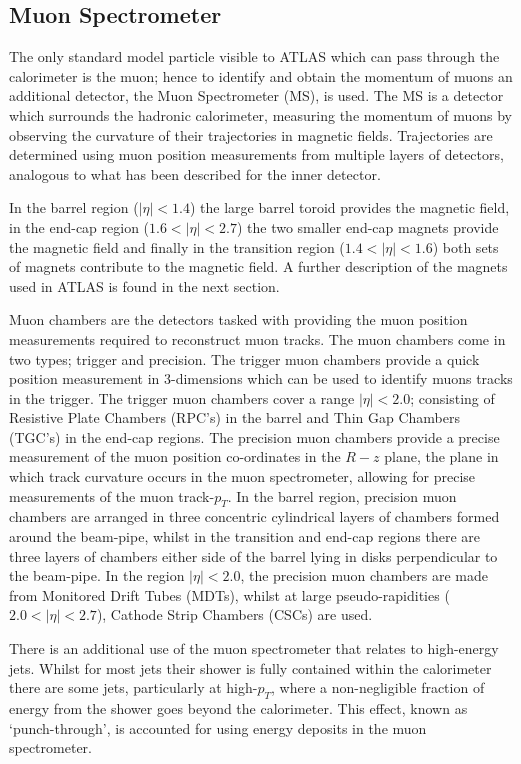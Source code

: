 \subsection{Muon Spectrometer}
\label{sec:det-MS}

The only standard model particle visible to ATLAS which can pass through the calorimeter is the muon;
hence to identify and obtain the momentum of muons an additional detector, the Muon Spectrometer (MS), is used.
The MS is a detector which surrounds the hadronic calorimeter,
measuring the momentum of muons by observing the curvature of their trajectories in magnetic fields.
Trajectories are determined using muon position measurements from multiple layers of detectors,
analogous to what has been described for the inner detector. 

In the barrel region ($|\eta| < 1.4$) the large barrel toroid provides the magnetic field,
in the end-cap region ($1.6 < |\eta| < 2.7$) the two smaller end-cap magnets  provide the magnetic field
and finally in the transition region ($1.4 < |\eta| < 1.6$) both sets of magnets contribute to the magnetic field.
A further description of the magnets used in ATLAS is found in the next section. 

Muon chambers are the detectors tasked with providing the muon position measurements required to reconstruct muon tracks.
The muon chambers come in two types; trigger and precision.
The trigger muon chambers provide a quick position measurement in 3-dimensions which can be used
to identify muons tracks in the trigger.
The trigger muon chambers cover a range $|\eta| < 2.0$;
consisting of Resistive Plate Chambers (RPC’s) in the barrel and Thin Gap Chambers (TGC’s) in the end-cap regions.
The precision muon chambers provide a precise measurement of the muon position co-ordinates in the $R-z$ plane,
the plane in which track curvature occurs in the muon spectrometer, allowing for precise measurements of the muon track-$p_T$. 
In the barrel region, precision muon chambers are arranged in three concentric cylindrical layers of chambers formed around the beam-pipe,
whilst in the transition and end-cap regions there are three layers of chambers either side of the barrel lying in disks perpendicular to the beam-pipe.
In the region $|\eta| < 2.0$, the precision muon chambers are made from Monitored Drift Tubes (MDTs),
whilst at large pseudo-rapidities ($2.0 < |\eta| < 2.7$), Cathode Strip Chambers (CSCs) are used.


There is an additional use of the muon spectrometer that relates to high-energy jets.
Whilst for most jets their shower is fully contained within the calorimeter
there are some jets, particularly at high-$p_T$, where a non-negligible fraction of energy from the shower goes beyond the calorimeter.
This effect, known as `punch-through', is accounted for using energy deposits in the muon spectrometer.

